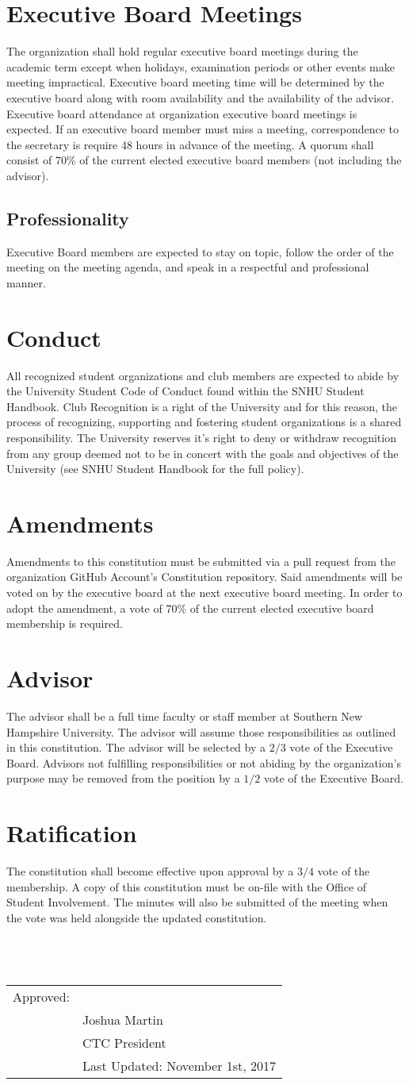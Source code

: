 \documentclass{article}
\newcommand{\datechanged}{Last Updated: November 1st, 2017}
\newcommand{\article}[1]{\section{#1} \label{#1}}
\newcommand{\asection}[1]{\subsection{#1} \label{#1}}
\begin{document}
\article{Executive Board Meetings}
The organization shall hold regular executive board meetings during the academic term except when holidays, examination periods or other events make meeting impractical. 
Executive board meeting time will be determined by the executive board along with room availability and the availability of the advisor. 
Executive board attendance at organization executive board meetings is expected. 
If an executive board member must miss a meeting, correspondence to the secretary is require 48 hours in advance of the meeting. 
A quorum shall consist of 70\% of the current elected executive board members (not including the advisor). 

\asection{Professionality}
Executive Board members are expected to stay on topic, follow the order of the meeting on the meeting agenda, and speak in a respectful and professional manner. 
 
\article{Conduct}
All recognized student organizations and club members are expected to abide by the University Student Code of Conduct found within the SNHU Student Handbook. 
Club Recognition is a right of the University and for this reason, the process of recognizing, supporting and fostering student organizations is a shared responsibility. 
The University reserves it's right to deny or withdraw recognition from any group deemed not to be in concert with the goals and objectives of the University (see SNHU Student Handbook for the full policy).

\article{Amendments}
Amendments to this constitution must be submitted via a pull request from the organization GitHub Account's Constitution repository. 
Said amendments will be voted on by the executive board at the next executive board meeting. 
In order to adopt the amendment, a vote of 70\% of the current elected executive board membership is required.

\article{Advisor}
The advisor shall be a full time faculty or staff member at Southern New Hampshire University. 
The advisor will assume those responsibilities as outlined in this constitution. 
The advisor will be selected by a $2/3$ vote of the Executive Board. 
Advisors not fulfilling responsibilities or not abiding by the organization's purpose may be removed from the position by a $1/2$ vote of the Executive Board.

\article{Ratification}
The constitution shall become effective upon approval by a $3/4$ vote of the membership. 
A copy of this constitution must be on-file with the Office of Student Involvement. 
The minutes will also be submitted of the meeting when the vote was held alongside the updated constitution.\\ \\ \\ \\

\begin{tabular}{@{}p{.5in}p{4in}@{}}
Approved: & \hrulefill \\
& Joshua Martin \\
& CTC President\\
& \datechanged
\end{tabular}
\end{document}
